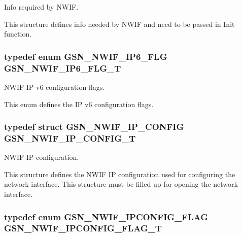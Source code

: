 Info required by NWIF. 

This structure defines info needed by NWIF and need to be passed in Init function. \hypertarget{a00670_gaeae6a78e867541f488c5b1db9f7508f7}{
\subsubsection[{GSN\_\-NWIF\_\-IP6\_\-FLG\_\-T}]{\setlength{\rightskip}{0pt plus 5cm}typedef enum {\bf GSN\_\-NWIF\_\-IP6\_\-FLG} {\bf GSN\_\-NWIF\_\-IP6\_\-FLG\_\-T}}}
\label{a00670_gaeae6a78e867541f488c5b1db9f7508f7}


NWIF IP v6 configuration flags. 

This enum defines the IP v6 configuration flags. \hypertarget{a00670_ga72947a68a092d535f5989c7c5e2fe71b}{
\subsubsection[{GSN\_\-NWIF\_\-IP\_\-CONFIG\_\-T}]{\setlength{\rightskip}{0pt plus 5cm}typedef struct {\bf GSN\_\-NWIF\_\-IP\_\-CONFIG}  {\bf GSN\_\-NWIF\_\-IP\_\-CONFIG\_\-T}}}
\label{a00670_ga72947a68a092d535f5989c7c5e2fe71b}


NWIF IP configuration. 

This structure defines the NWIF IP configuration used for configuring the network interface. This structure must be filled up for opening the network interface. \hypertarget{a00670_ga952c642f49bc1ff0ab65d34c4843b5e9}{
\subsubsection[{GSN\_\-NWIF\_\-IPCONFIG\_\-FLAG\_\-T}]{\setlength{\rightskip}{0pt plus 5cm}typedef enum {\bf GSN\_\-NWIF\_\-IPCONFIG\_\-FLAG} {\bf GSN\_\-NWIF\_\-IPCONFIG\_\-FLAG\_\-T}}}
\label{a00670_ga952c642f49bc1ff0ab65d34c4843b5e9}


